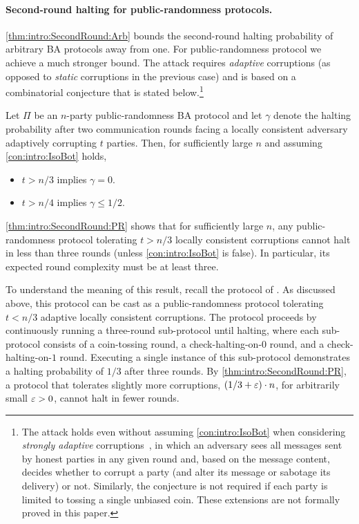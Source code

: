 \paragraph{Second-round halting for public-randomness protocols.}
\cref{thm:intro:SecondRound:Arb} bounds the second-round halting probability of arbitrary BA protocols away from one. For public-randomness protocol we  achieve a much stronger bound. The attack requires \emph{adaptive} corruptions (as opposed to \emph{static} corruptions in the previous case) and is based on a combinatorial conjecture that is stated below.\footnote{The attack holds even without assuming \cref{con:intro:IsoBot} when considering \emph{strongly adaptive} corruptions~\cite{GKP15}, in which an adversary sees all messages sent by honest parties in any given round and, based on the message content, decides whether to corrupt a party (and alter its message or sabotage its delivery) or not. Similarly, the conjecture is not required if each party is limited to tossing a single unbiased coin. These extensions are not formally proved in this paper.\label{footnote:no_conjecture}}

\begin{theorem}\label{thm:intro:SecondRound:PR}
Let $\Pi$ be an $n$-party public-randomness BA protocol and let $\gamma$ denote the halting probability after two communication rounds facing a locally consistent adversary adaptively corrupting $t$ parties.
Then, for sufficiently large $n$ and assuming \cref{con:intro:IsoBot} holds,
\begin{itemize}
\item $t > n/3$ implies $\gamma=0$.
\item $t > n/4$ implies $\gamma \leq 1/2$.
\end{itemize}
\end{theorem}

\cref{thm:intro:SecondRound:PR} shows that for sufficiently large $n$, any public-randomness protocol tolerating $t>n/3$ locally consistent corruptions cannot halt in less than three rounds (unless  \cref{con:intro:IsoBot}  is false). In particular, its expected round complexity must be at least three.

To understand the meaning of this result, recall the protocol of \citet{Micali17}. As discussed above, this protocol can be cast as a public-randomness protocol tolerating $t<n/3$ adaptive locally consistent corruptions. The protocol proceeds by continuously running a three-round sub-protocol until halting, where each sub-protocol consists of a coin-tossing round, a check-halting-on-$0$ round, and a check-halting-on-$1$ round. Executing a single instance of this
sub-protocol demonstrates a halting probability of $1/3$ after three rounds.
By \cref{thm:intro:SecondRound:PR}, a protocol that tolerates slightly more corruptions, \ie $(1/3 +\varepsilon) \cdot n$, for arbitrarily small $\varepsilon>0$, cannot halt in fewer rounds.



